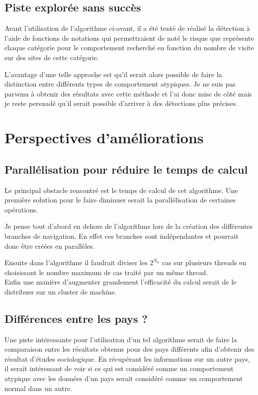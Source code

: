 \documentclass[a4paper, 11pt]{article}
\begin{document}
\subsection{Piste explorée sans succès}

Avant l'utilisation de l'algorithme ci-avant, il a été tenté de réalisé la détection à l'aide de fonctions de notations qui permettraient de noté le risque que représente chaque catégorie pour le comportement recherché en fonction du nombre de visite sur des sites de cette catégorie.

L'avantage d'une telle approche est qu'il serait alors possible de faire la distinction entre différents types de comportement atypiques. Je ne suis pas parvenu à obtenir des résultats avec cette méthode et l'ai donc mise de côté mais je reste persuadé qu'il serait possible d'arriver à des détections plus précises.

\section{Perspectives d'améliorations}
\subsection{Parallélisation pour réduire le temps de calcul}

Le principal obstacle rencontré est le temps de calcul de cet algorithme. Une première solution pour le faire diminuer serait la parallélisation de certaines opérations.

Je pense tout d'abord en dehors de l'algorithme lors de la création des différentes branches de navigation. En effet ces branches sont indépendantes et pourrait donc être créées en parallèles.

Ensuite dans l'algorithme il faudrait diviser les $2^{N_a}$ cas sur plusieurs threads en choisissant le nombre maximum de cas traité par un même thread.\\

Enfin une manière d'augmenter grandement l'efficacité du calcul serait de le distribuer sur un cluster de machine.


\subsection{Différences entre les pays ?}

Une piste intéressante pour l'utilisation d'un tel algorithme serait de faire la comparaison entre les résultats obtenus pour des pays différents afin d'obtenir des résultat d'études sociologique. En récupérant les informations sur un autre pays, il serait intéressant de voir si ce qui est considéré comme un comportement atypique avec les données d'un pays serait considéré comme un comportement normal dans un autre.
\end{document}
